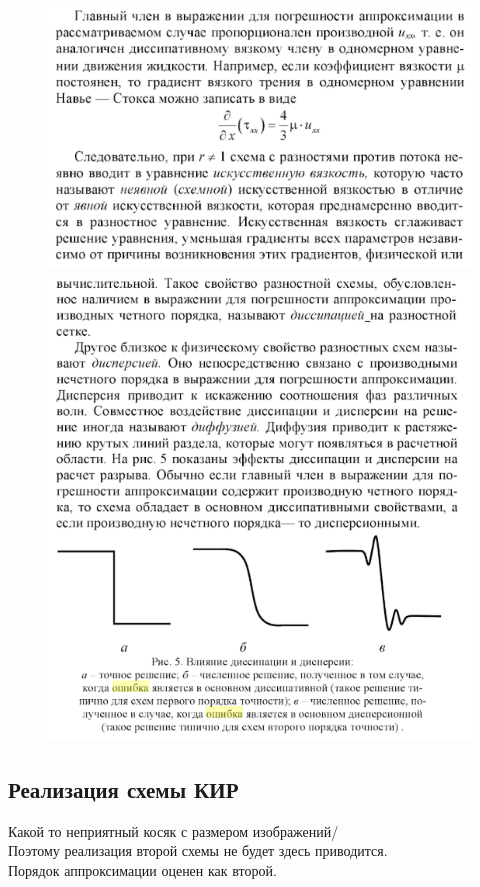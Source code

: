 \documentclass[a4paper,14pt]{article}
\begin{document}
    \begin{figure}[h]
		\begin{center}
			\includegraphics[width=\textwidth, height=16\normalbaselineskip]{diss}
			\includegraphics[width=\textwidth, height=22\normalbaselineskip]{disp}
		\end{center}
	\end{figure}
    \newpage
    \newpage
    \subsection{Реализация схемы КИР}
    Какой то неприятный косяк с размером изображений/\\
    Поэтому реализация второй схемы не будет здесь приводится.\\
    Порядок аппроксимации оценен как второй.
\end{document}
